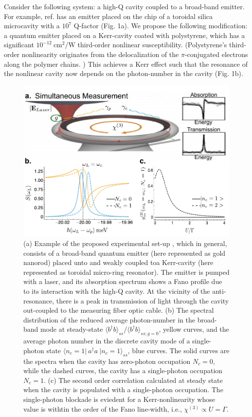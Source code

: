\documentclass[12pt]{article}
\begin{document}
Consider the following system: a high-Q cavity coupled to a broad-band 
emitter. For example, ref. \cite{pan2019elucidating} has an emitter placed 
on the chip of a toroidal silica microcavity with a $10^{7}$ Q-factor 
(Fig. 1a). We propose the following modification: a quantum emitter placed 
on a Kerr-cavity coated with polystyrene, which has a significant 
$10^{- 12} \:\mathrm{cm}^2/\mathrm{W}$ third-order nonlinear 
susceptibility. \cite{qin2010design, liu200910} (Polystyrene's third-order 
nonlinearity originates from the delocalization of the $\pi$-conjugated 
electrons along the polymer chains. \cite{krausz1989optical, 
wong1991studies}) This achieves a Kerr effect such that the resonance of 
the nonlinear cavity now depends on the photon-number in the cavity 
(Fig. 1b).

\begin{figure}
  \centering
  \includegraphics[width=1\linewidth]{fig.pdf}
  \caption{(a) Example of the proposed experimental set-up
  \cite{pan2019elucidating}, which in general, consists of a broad-band
  quantum emitter (here represented as gold nanorod) placed unto\textemdash
  and weakly coupled to\textemdash a Kerr-cavity (here represented as
  toroidal micro-ring resonator). The emitter is pumped with a
  laser, and its absorption spectrum shows a Fano profile due
  to its interaction with the high-Q cavity. At the vicinity of the
  anti-resonance, there is a peak in transmission of light through the cavity
  out-coupled to the measuring fiber optic cable. (b) The spectral distribution
  of the reduced average photon-number in the broad-band mode at steady-state
  $\langle b^{\dagger}b \rangle_{ss}/\langle b^{\dagger}b \rangle_{ss; g=0}$,
  yellow curves, and the average photon number in the discrete cavity mode 
  of a single-photon state $\langle n_c=1\vert \: a^{\dagger}a \:
  \vert n_c=1 \rangle_{ss}$, blue curves. 
  The solid curves are the spectra when the cavity has zero-photon
  occupation $N_c=0$, while the dashed curves, the cavity has a single-photon
  occupation $N_c=1$. (c) The second order correlation calculated at steady
  state when the cavity is populated with a single-photon occupation.
  The single-photon blockade is eviedent for a Kerr-nonlinearity whose value is
  withtin the order of the Fano line-width, i.e., $\chi^{(3)} \propto U=\Gamma$.
  }
  \label{fig}
\end{figure}
\end{document}
